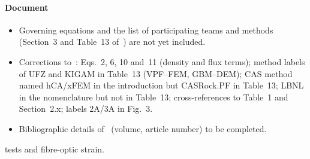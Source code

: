 \documentclass[11pt,a4paper]{article}
\newcommand{\open}{$\square$}
\begin{document}
\begin{itemize}
\paragraph{Document}
\begin{itemize}[label=\open]
  \item Governing equations and the list of participating teams and methods
        (Section~3 and Table~13 of~\cite{Pan2026}) are not yet included.
  \item Corrections to~\cite{Pan2026}: Eqs.~2, 6, 10 and~11 (density and flux
        terms); method labels of UFZ and KIGAM in Table~13 (VPF--FEM,
        GBM--DEM); CAS method named hCA/xFEM in the introduction but
        CASRock.PF in Table~13; LBNL in the nomenclature but not in
        Table~13; cross-references to Table~1 and Section~2.x; labels 2A/3A
        in Fig.~3.
  \item Bibliographic details of~\cite{Mollaali2026} (volume, article number)
        to be completed.
\end{itemize}

 tests and fibre-optic strain.
\end{itemize}

\nocite{McDermott2018,Kolditz2025,Mollaali2026}


\end{document}

